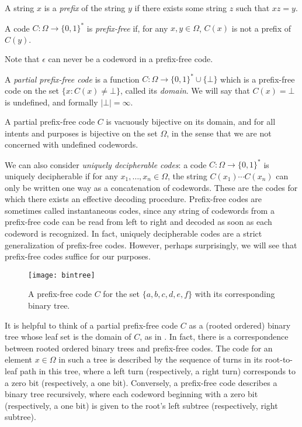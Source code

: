 \begin{defn}
  A string $x$ is a \emph{prefix} of the string $y$ if there exists
  some string $z$ such that $xz = y$.
\end{defn}

\begin{defn}
  A code $C : \Omega \to \{0, 1\}^*$ is \emph{prefix-free} if, for any
  $x, y \in \Omega$, $C(x)$ is not a prefix of $C(y)$.
\end{defn}

Note that $\epsilon$ can never be a codeword in a prefix-free code.

\begin{defn}
  A \emph{partial prefix-free code} is a function $C : \Omega \to \{0,
  1\}^* \cup \{\bot\}$ which is a prefix-free code on the set $\{x :
  C(x) \neq \bot\}$, called its \emph{domain}. We will say that $C(x)
  = \bot$ is undefined, and formally $|\bot| = \infty$.
\end{defn}

A partial prefix-free code $C$ is vacuously bijective on its domain,
and for all intents and purposes is bijective on the set $\Omega$, in
the sense that we are not concerned with undefined codewords.

We can also consider \emph{uniquely decipherable codes}: a code ${C :
  \Omega \to \{0, 1\}^*}$ is uniquely decipherable if for any $x_1,
\dots, x_n \in \Omega$, the string $C(x_1) \cdots C(x_n)$ can only be
written one way as a concatenation of codewords. These are the codes
for which there exists an effective decoding procedure. Prefix-free
codes are sometimes called instantaneous codes, since any string of
codewords from a prefix-free code can be read from left to right and
decoded as soon as each codeword is recognized. In fact, uniquely
decipherable codes are a strict generalization of prefix-free
codes. However, perhaps surprisingly, we will see that prefix-free
codes suffice for our purposes.

\begin{figure}
  \centering
  \texttt{[image: bintree]}
  \caption{A prefix-free code $C$ for the set $\{a, b, c, d, e, f\}$
    with its corresponding binary tree.}
\end{figure}

It is helpful to think of a partial prefix-free code $C$ as a (rooted
ordered) binary tree whose leaf set is the domain of $C$, as in
. In fact, there is a correspondence between rooted
ordered binary trees and prefix-free codes. The code for an element
$x \in \Omega$ in such a tree is described by the sequence of turns in
its root-to-leaf path in this tree, where a left turn (respectively, a
right turn) corresponds to a zero bit (respectively, a one
bit). Conversely, a prefix-free code describes a binary tree
recursively, where each codeword beginning with a zero bit
(respectively, a one bit) is given to the root's left subtree
(respectively, right subtree).

